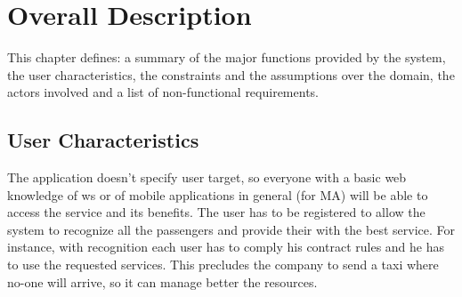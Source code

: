 \chapter{Overall Description}

\setmyfancystyle

\label{overall}
This chapter defines: a summary of the major functions provided by the system, the \gls{user} characteristics, the constraints and the assumptions over the domain, the actors involved and a list of non-functional requirements.
 
\section{User Characteristics}
The application doesn't specify \gls{user} target, so everyone with a basic web knowledge of \gls{ws} or of mobile applications in general (for MA) will be able to access the service and its benefits. The \gls{user} has to be registered to allow the system to recognize all the passengers and provide their with the best service. For instance, with recognition each \gls{user} has to comply his contract rules and he has to use the requested services. This precludes the company to send a taxi where no-one will arrive, so it can manage better the resources.


